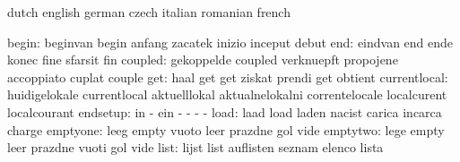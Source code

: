 


\startelements             dutch                     english
                           german                    czech
                           italian                   romanian
                           french

                    begin: beginvan                  begin
                           anfang                    zacatek
                           inizio                    inceput
                           debut
                      end: eindvan                   end
                           ende                      konec
                           fine                      sfarsit
                           fin
                  coupled: gekoppelde                coupled
                           verknuepft                propojene
                           accoppiato                cuplat
                           couple
                      get: haal                      get
                           get                       ziskat
                           prendi                    get
                           obtient
             currentlocal: huidigelokale             currentlocal
                           aktuelllokal              aktualnelokalni
                           correntelocale            localcurent
                           localcourant
                 endsetup: in                        -
                           ein                       -
                           -                         -
                           -
                     load: laad                      load
                           laden                     nacist
                           carica                    incarca
                           charge
                 emptyone: leeg                      empty
                           vuoto                     leer
                           prazdne                   gol
                           vide
                 emptytwo: lege                      empty
                           leer                      prazdne
                           vuoti                     gol
                           vide
                     list: lijst                     list
                           auflisten                 seznam
                           elenco                    lista
